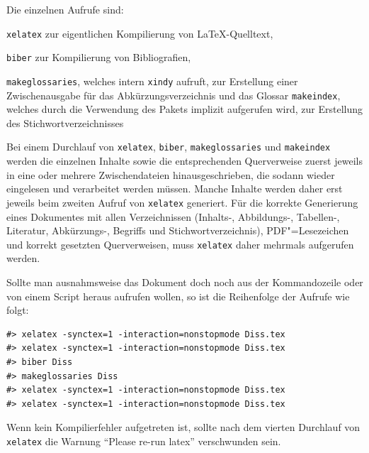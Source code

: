 Die einzelnen Aufrufe sind:
\begin{itemize*}
\item {}\texttt{xelatex} zur eigentlichen Kompilierung von \LaTeX-Quelltext,
\item {}\texttt{biber} zur Kompilierung von Bibliografien,
\item {}\texttt{makeglossaries}, welches intern \texttt{xindy} aufruft,
zur Erstellung einer Zwischenausgabe für das Abkürzungsverzeichnis und das Glossar
\texttt{makeindex}, welches durch die Verwendung des Pakets  implizit aufgerufen wird, zur Erstellung des Stichwortverzeichnisses
\end{itemize*}
Bei einem Durchlauf von \texttt{xelatex}, \texttt{biber}, \texttt{makeglossaries} und \texttt{makeindex}
werden die einzelnen Inhalte sowie die entsprechenden Querverweise
zuerst jeweils in eine oder mehrere Zwischendateien hinausgeschrieben,
die sodann wieder eingelesen und verarbeitet werden müssen.
Manche Inhalte werden daher erst jeweils beim zweiten Aufruf von \texttt{xelatex} generiert.
Für die korrekte Generierung eines Dokumentes mit allen Verzeichnissen
(Inhalts-, Abbildungs-, Tabellen-, Literatur, Abkürzungs-, Begriffs und Stichwortverzeichnis),
PDF"=Lesezeichen und korrekt gesetzten Querverweisen,
muss \texttt{xelatex} daher mehrmals aufgerufen werden.

Sollte man ausnahmsweise das Dokument doch noch aus der Kommandozeile oder von einem Script heraus aufrufen wollen,
so ist die Reihenfolge der Aufrufe wie folgt:
\begin{verbatim}
#> xelatex -synctex=1 -interaction=nonstopmode Diss.tex
#> xelatex -synctex=1 -interaction=nonstopmode Diss.tex
#> biber Diss
#> makeglossaries Diss
#> xelatex -synctex=1 -interaction=nonstopmode Diss.tex
#> xelatex -synctex=1 -interaction=nonstopmode Diss.tex
\end{verbatim}

Wenn kein Kompilierfehler aufgetreten ist,
sollte nach dem vierten Durchlauf von \texttt{xelatex} die
Warnung \enquote{Please re-run latex}
verschwunden sein.